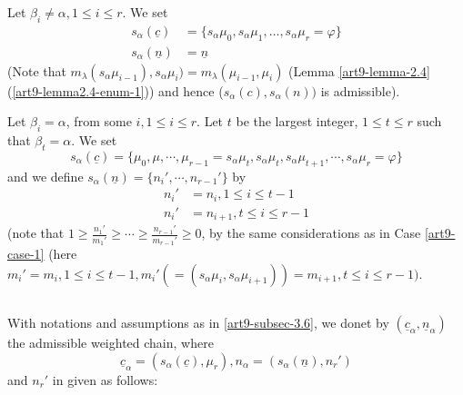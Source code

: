 \begin{case}\label{art9-case-1}
Let $\beta_{i}\neq \alpha, 1 \leq i \leq r$. We set
\begin{align*}
s_{\alpha}(\underline{c}) &= \{s_{\alpha}\mu_{0}, s_{\alpha}\mu_{1}, \ldots, s_{\alpha}\mu_{r} = {\varphi}\}\\
s_{\alpha}(\underline{n}) &= \underline{n}
\end{align*}
(Note that $m_{\lambda}(s_{\alpha}\mu_{i-1}), s_{\alpha}\mu_{i}) = m_{\lambda}(\mu_{i-1}, \mu_{i})$
(Lemma \ref{art9-lemma-2.4} (\ref{art9-lemma2.4-enum-1})) and hence ($s_{\alpha}(c), s_{\alpha}(n))$ is admissible). 
\end{case}

\begin{case}\label{art9-case-2}
Let $\beta_{i}= \alpha$, from some $i, 1\leq i \leq r$. Let $t$ be the largest integer, $1 \leq t \leq r$ such that $\beta_{t} = \alpha$. We set
$$
s_{\alpha}(\underline{c}) = \{ \mu_{0}, \mu, \cdots, \mu_{r-1} = s_{\alpha}\mu_{t}, s_{\alpha}\mu_{t}, s_{\alpha}\mu_{t+1}, \cdots, s_{\alpha}\mu_{r} = \varphi\}
$$
and we define $s_{\alpha}(\underline{n}) = \{n_{i}', \cdots, n_{r-1}'\}$ by
\begin{align*}
n_{i}' &= n_{i}, 1\leq i \leq t-1\\
n_{i}' &= n_{i+1}, t\leq i\leq r-1
\end{align*}
(note that $1 \geq \frac{n_{1}'}{m_{1}'} \geq \cdots \geq \frac{n_{r-1}'}{m_{r-1}'} \geq 0$, by the same considerations as in Case \ref{art9-case-1} (here $m_{i}' =m_{i}, 1 \leq i \leq t-1, m_{i}'(=(s_{\alpha}\mu_{i}, s_{\alpha}\mu_{i+1}))=m_{i+1}, t \leq i \leq r-1)$.
\end{case}

\subsection{}\label{art9-subsec-3.7}
With notations and assumptions as in \ref{art9-subsec-3.6}, we donet by $(\underline{c}_{\alpha}, \underline{n}_{\alpha})$ the admissible weighted chain, where
$$
\underline{c}_{\alpha} = (s_{\alpha}(\underline{c}), \mu_{r}), n_{\alpha} = (s_{\alpha}(\underline{n}), n_{r}')
$$
and $n_{r}'$ in given as follows:

